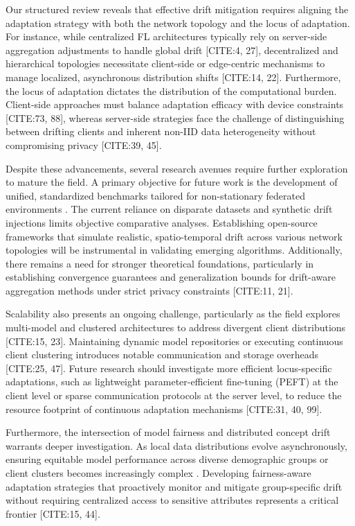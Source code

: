 \documentclass[journal]{IEEEtran}
\begin{document}
Our structured review reveals that effective drift mitigation requires aligning the adaptation strategy with both the network topology and the locus of adaptation. For instance, while centralized FL architectures typically rely on server-side aggregation adjustments to handle global drift [CITE:4, 27], decentralized and hierarchical topologies necessitate client-side or edge-centric mechanisms to manage localized, asynchronous distribution shifts [CITE:14, 22]. Furthermore, the locus of adaptation dictates the distribution of the computational burden. Client-side approaches must balance adaptation efficacy with device constraints [CITE:73, 88], whereas server-side strategies face the challenge of distinguishing between drifting clients and inherent non-IID data heterogeneity without compromising privacy [CITE:39, 45]. 

Despite these advancements, several research avenues require further exploration to mature the field. A primary objective for future work is the development of unified, standardized benchmarks tailored for non-stationary federated environments \cite{Mahdi2025}. The current reliance on disparate datasets and synthetic drift injections limits objective comparative analyses. Establishing open-source frameworks that simulate realistic, spatio-temporal drift across various network topologies will be instrumental in validating emerging algorithms. Additionally, there remains a need for stronger theoretical foundations, particularly in establishing convergence guarantees and generalization bounds for drift-aware aggregation methods under strict privacy constraints [CITE:11, 21].

Scalability also presents an ongoing challenge, particularly as the field explores multi-model and clustered architectures to address divergent client distributions [CITE:15, 23]. Maintaining dynamic model repositories or executing continuous client clustering introduces notable communication and storage overheads [CITE:25, 47]. Future research should investigate more efficient locus-specific adaptations, such as lightweight parameter-efficient fine-tuning (PEFT) at the client level or sparse communication protocols at the server level, to reduce the resource footprint of continuous adaptation mechanisms [CITE:31, 40, 99].

Furthermore, the intersection of model fairness and distributed concept drift warrants deeper investigation. As local data distributions evolve asynchronously, ensuring equitable model performance across diverse demographic groups or client clusters becomes increasingly complex \cite{Badar2023}. Developing fairness-aware adaptation strategies that proactively monitor and mitigate group-specific drift without requiring centralized access to sensitive attributes represents a critical frontier [CITE:15, 44].
\end{document}
